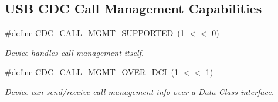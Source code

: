 \subsection*{U\+SB C\+DC Call Management Capabilities}
\begin{DoxyCompactItemize}
\item 
\mbox{\label{group__cdc__protocol__group_gadba5c50400705310683bce4604525634}} 
\#define \hyperlink{group__cdc__protocol__group_gadba5c50400705310683bce4604525634}{C\+D\+C\+\_\+\+C\+A\+L\+L\+\_\+\+M\+G\+M\+T\+\_\+\+S\+U\+P\+P\+O\+R\+T\+ED}~(1 $<$$<$ 0)
\begin{DoxyCompactList}\small\item\em Device handles call management itself. \end{DoxyCompactList}\item 
\mbox{\label{group__cdc__protocol__group_ga84beb2dffd6b294aed339d1dcf4dadf2}} 
\#define \hyperlink{group__cdc__protocol__group_ga84beb2dffd6b294aed339d1dcf4dadf2}{C\+D\+C\+\_\+\+C\+A\+L\+L\+\_\+\+M\+G\+M\+T\+\_\+\+O\+V\+E\+R\+\_\+\+D\+CI}~(1 $<$$<$ 1)
\begin{DoxyCompactList}\small\item\em Device can send/receive call management info over a Data Class interface. \end{DoxyCompactList}\end{DoxyCompactItemize}
